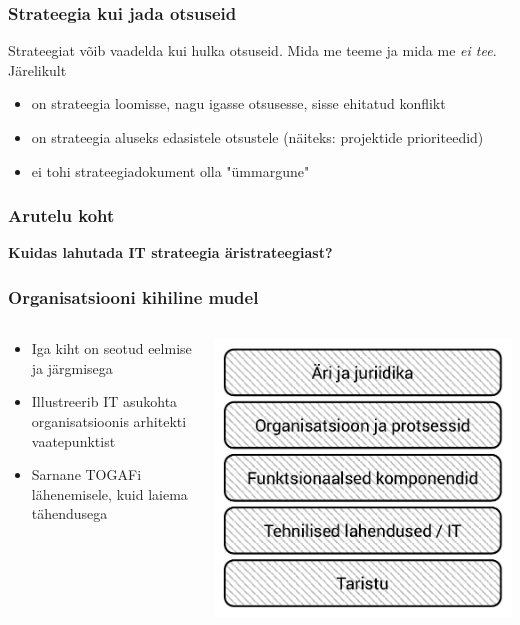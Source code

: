 \begin{frame}[fragile]
  \frametitle{Strateegia kui jada otsuseid}
	Strateegiat võib vaadelda kui hulka otsuseid. Mida me teeme ja mida me \emph{ei tee}. Järelikult
	\begin{itemize}
		\item on strateegia loomisse, nagu igasse otsusesse, sisse ehitatud konflikt
		\item on strateegia aluseks edasistele otsustele (näiteks: projektide prioriteedid)
		\item ei tohi strateegiadokument olla "ümmargune"
	\end{itemize}
\end{frame}


\begin{frame}[fragile]
  \frametitle{Arutelu koht}
		\begin{center}
			\textbf{Kuidas lahutada IT strateegia äristrateegiast?}
		\end{center}
\end{frame}

\begin{frame}[fragile,label={stack}]
	\frametitle{Organisatsiooni kihiline mudel}
	\begin{columns}[t]
		\begin{column}{6cm}
			\begin{itemize}
				\item Iga kiht on seotud eelmise ja järgmisega
				\item Illustreerib IT asukohta organisatsioonis arhitekti vaatepunktist
				\item Sarnane TOGAFi lähenemisele, kuid laiema tähendusega
			\end{itemize}
		\end{column}
		\begin{column}[T]{5cm}
			\includegraphics[width=\textwidth]{stack.pdf}
		\end{column}
	\end{columns}
\end{frame}

